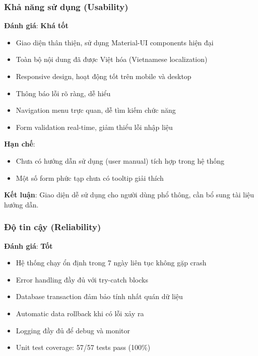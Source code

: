 \subsubsection{Khả năng sử dụng (Usability)}

\textbf{Đánh giá}: \textbf{Khá tốt}

\begin{itemize}
    \item Giao diện thân thiện, sử dụng Material-UI components hiện đại
    \item Toàn bộ nội dung đã được Việt hóa (Vietnamese localization)
    \item Responsive design, hoạt động tốt trên mobile và desktop
    \item Thông báo lỗi rõ ràng, dễ hiểu
    \item Navigation menu trực quan, dễ tìm kiếm chức năng
    \item Form validation real-time, giảm thiểu lỗi nhập liệu
\end{itemize}

\textbf{Hạn chế}:
\begin{itemize}
    \item Chưa có hướng dẫn sử dụng (user manual) tích hợp trong hệ thống
    \item Một số form phức tạp chưa có tooltip giải thích
\end{itemize}

\textbf{Kết luận}: Giao diện dễ sử dụng cho người dùng phổ thông, cần bổ sung tài liệu hướng dẫn.

\subsubsection{Độ tin cậy (Reliability)}

\textbf{Đánh giá}: \textbf{Tốt}

\begin{itemize}
    \item Hệ thống chạy ổn định trong 7 ngày liên tục không gặp crash
    \item Error handling đầy đủ với try-catch blocks
    \item Database transaction đảm bảo tính nhất quán dữ liệu
    \item Automatic data rollback khi có lỗi xảy ra
    \item Logging đầy đủ để debug và monitor
    \item Unit test coverage: 57/57 tests pass (100\%)
\end{itemize}

